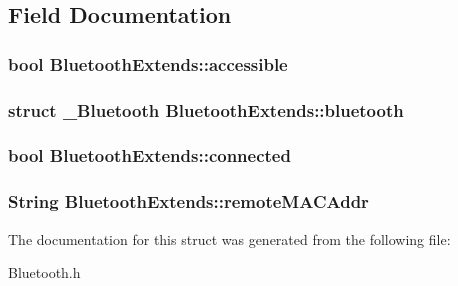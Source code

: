 \subsection{Field Documentation}
\subsubsection[{accessible}]{\setlength{\rightskip}{0pt plus 5cm}bool Bluetooth\-Extends\-::accessible}\label{structBluetoothExtends_aab289e7470c5f2b7c5c35176418bae58}
\subsubsection[{bluetooth}]{\setlength{\rightskip}{0pt plus 5cm}struct {\bf \-\_\-\-Bluetooth} Bluetooth\-Extends\-::bluetooth}\label{structBluetoothExtends_a2988c3ea61c07f204d31abe492d8c4bd}
\subsubsection[{connected}]{\setlength{\rightskip}{0pt plus 5cm}bool Bluetooth\-Extends\-::connected}\label{structBluetoothExtends_ab98405f37820fcedb613ae4a9bee2708}
\subsubsection[{remote\-M\-A\-C\-Addr}]{\setlength{\rightskip}{0pt plus 5cm}String Bluetooth\-Extends\-::remote\-M\-A\-C\-Addr}\label{structBluetoothExtends_a17bcb4936e21d1f61086e6287b555978}


The documentation for this struct was generated from the following file\-:\begin{DoxyCompactItemize}
\item 
Bluetooth.\-h\end{DoxyCompactItemize}
